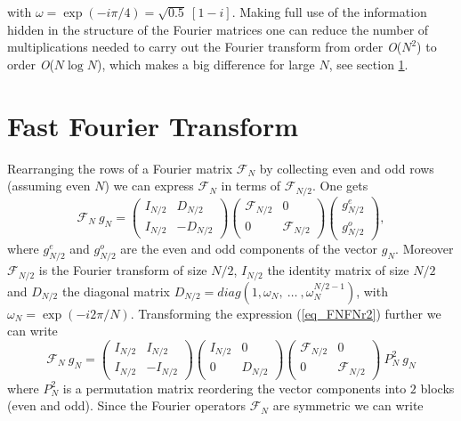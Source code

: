 with $\omega = \exp(-i \pi /4) = \sqrt{0.5} \ [1-i]$. Making
full use of the information hidden in the structure of the 
Fourier matrices one can reduce the number of multiplications
needed to carry out the Fourier transform from order 
{\it O}($N^2$) to order {\it O}($N \log N$), which makes a 
big difference for large $N$, see section \ref{sec_fft}. 

\section{Fast Fourier Transform} \label{sec_fft}
Rearranging the rows of a Fourier matrix $\mathcal{F}_{N}$
by collecting even and odd rows (assuming even $N$) we
can express $\mathcal{F}_N$ in terms of $\mathcal{F}_{N/2}$. 
One gets
\begin{equation}  \label{eq_FNFNr2}
 \mathcal{F}_{N} \ g_{N} 
  =
 \left(
  \begin{array}{cr}
   I_{N/2} &  D_{N/2}
           \\
   I_{N/2} & -D_{N/2}
  \end{array}
 \right)
 \left(
  \begin{array}{cr}
   \mathcal{F}_{N/2} &     0
           \\
        0            & \mathcal{F}_{N/2}
  \end{array}
 \right)
 \left(     
  \begin{array}{c}
   g_{N/2}^{e}
    \\
   g_{N/2}^{o}
  \end{array} 
 \right),
\end{equation} 
where $g^{e}_{N/2}$ and $g^{o}_{N/2}$ are the even and odd
components of the vector $g_{N}$. Moreover $\mathcal{F}_{N/2}$ 
is the Fourier transform of size $N/2$, $I_{N/2}$ the identity 
matrix of size $N/2$ and $D_{N/2}$ the diagonal matrix 
$D_{N/2} =  diag(1,\omega_{N},\ \dots \ , \omega_{N}^{N/2 - 1})$,
with $\omega_{N} = \exp ( -i 2 \pi / N )$. Transforming the
expression (\ref{eq_FNFNr2}) further we can write
\begin{equation}  \label{eq_FNFNr2_01}
 \mathcal{F}_{N} \ g_{N} 
  =
 \left(
  \begin{array}{cr}
   I_{N/2} &  I_{N/2}
           \\
   I_{N/2} & -I_{N/2}
  \end{array}
 \right)
 \left(
  \begin{array}{cr}
   I_{N/2} &     0
          \\
      0    &   D_{N/2}
  \end{array}
 \right)
 \left(
  \begin{array}{cr}
   \mathcal{F}_{N/2} &     0
           \\
        0            & \mathcal{F}_{N/2}
  \end{array}
 \right)
  \ P_{N}^{2} \ g_{N}
\end{equation} 
where $P_{N}^{2}$ is a permutation matrix reordering the 
vector components into $2$ blocks (even and odd). Since
the Fourier operators $\mathcal{F}_{N}$ are symmetric we can
write       



